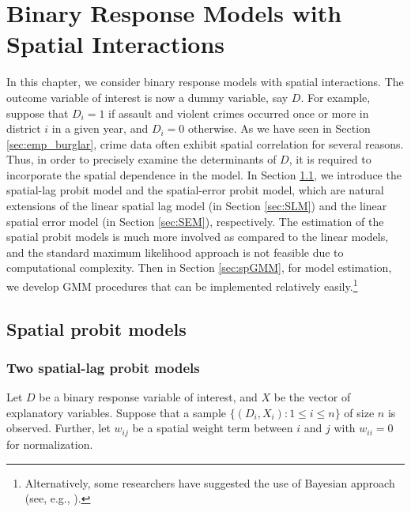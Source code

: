 \documentclass[10.5pt, A4paper, openany, uplatex]{book}
\numberwithin{equation}{section}
\begin{document}
\chapter{Binary Response Models with Spatial Interactions}\label{chap:binary}

In this chapter, we consider binary response models with spatial interactions.
The outcome variable of interest is now a dummy variable, say $D$.
For example, suppose that $D_i = 1$ if assault and violent crimes occurred once or more in district $i$ in a given year, and $D_i = 0$ otherwise.
As we have seen in Section \ref{sec:emp_burglar}, crime data often exhibit spatial correlation for several reasons.
Thus, in order to precisely examine the determinants of $D$, it is required to incorporate the spatial dependence in the model.
In Section \ref{sec:spprobit}, we introduce the spatial-lag probit model and the spatial-error probit model, which are natural extensions of the linear spatial lag model (in Section \ref{sec:SLM}) and the linear spatial error model (in Section \ref{sec:SEM}), respectively.
The estimation of the spatial probit models is much more involved as compared to the linear models, and the standard maximum likelihood approach is not feasible due to computational complexity.
Then in Section \ref{sec:spGMM}, for model estimation, we develop GMM procedures that can be implemented relatively easily.\footnote{
	Alternatively, some researchers have suggested the use of Bayesian approach (see, e.g., \cite{lesage2009introduction}).
	}
\section{Spatial probit models}\label{sec:spprobit}

\subsection{Two spatial-lag probit models}
Let $D$ be a binary response variable of interest, and $X$ be the vector of explanatory variables.
Suppose that a sample $\{(D_i,X_i): 1 \le i \le n\}$ of size $n$ is observed.
Further, let $w_{ij}$ be a spatial weight term between $i$ and $j$ with $w_{ii} = 0$ for normalization.
\end{document}
